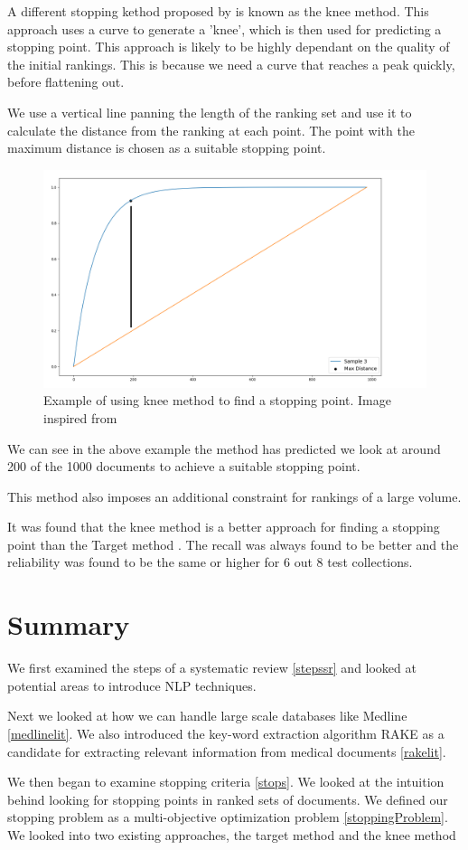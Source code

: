 A different stopping kethod proposed by \cite{Satopa11} is known as the knee method. This approach uses a curve to generate a 'knee', which is then used for predicting a stopping point. This approach is likely to be highly dependant on the quality of the initial rankings. This is because we need a curve that reaches a peak quickly, before flattening out.

We use a vertical line panning the length of the ranking set and use it to calculate the distance from the ranking at each point. The point with the maximum distance is chosen as a suitable stopping point.

\begin{figure}[H]
\center
\includegraphics[width=13cm]{figures/knee.png}
\caption{Example of using knee method to find a stopping point. Image inspired from \cite{Satopa11}}
\end{figure}

We can see in the above example the method has predicted we look at around 200 of the 1000 documents to achieve a suitable stopping point.

This method also imposes an additional constraint for rankings of a large volume. 

It was found that the knee method is a better approach for finding a stopping point than the Target method \cite{Cormack2016}. The recall was always found to be better and the reliability was found to be the same or higher for 6 out 8 test collections.

\section{Summary} \label{sumlit}

We first examined the steps of a systematic review \ref{stepssr} and looked at potential areas to introduce NLP techniques.

Next we looked at how we can handle large scale databases like Medline \ref{medlinelit}. We also introduced the key-word extraction algorithm RAKE as a candidate for extracting relevant information from medical documents \ref{rakelit}.

We then began to examine stopping criteria \ref{stops}. We looked at the intuition behind looking for stopping points in ranked sets of documents. We defined our stopping problem as a multi-objective optimization problem \ref{stoppingProblem}. We looked into two existing approaches, the target method and the knee method


